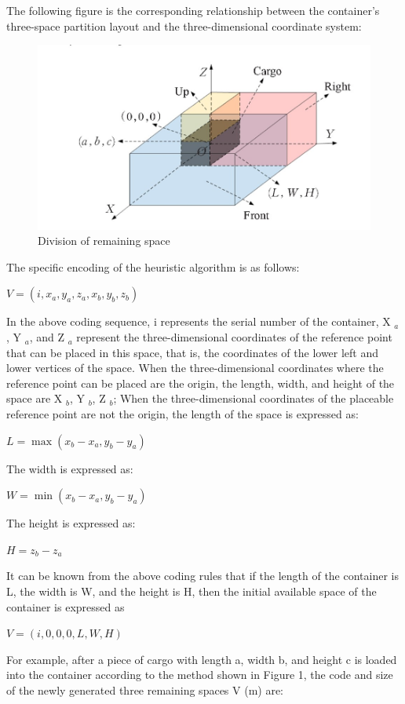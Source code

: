 \documentclass{article} %
\begin{document}
The following figure is the corresponding relationship between the container's three-space partition layout and the three-dimensional coordinate system:
\begin{figure}[h]
    \centering
    \includegraphics[scale=0.6]{99.png}
    \caption{Division of remaining space}
\end{figure}
The specific encoding of the heuristic algorithm is as follows:

\centerline{$V=\left(i, x_{a}, y_{a}, z_{a}, x_{b}, y_{b}, z_{b}\right)$}
In the above coding sequence, i represents the serial number of the container, X $ _a $, Y $ _a $, and Z $ _a $ represent the three-dimensional coordinates of the reference point that can be placed in this space, that is, the coordinates of the lower left and lower vertices of the space.
When the three-dimensional coordinates where the reference point can be placed are the origin, the length, width, and height of the space are X $ _b $, Y $ _b $, Z $ _b $;
When the three-dimensional coordinates of the placeable reference point are not the origin, the length of the space is expressed as:
\centerline{$L=\max \left(x_{b}-x_{a}, y_{b}-y_{a}\right)$}
The width is expressed as:

\centerline{$W=\min \left(x_{b}-x_{a}, y_{b}-y_{a}\right)$}

The height is expressed as:

\centerline{$H=z_{b}-z_{a}$}

It can be known from the above coding rules that if the length of the container is L, the width is W, and the height is H, then the initial available space of the container is expressed as

\centerline{$V=(i, 0,0,0, L, W, H)$}
For example, after a piece of cargo with length a, width b, and height c is loaded into the container according to the method shown in Figure 1, the code and size of the newly generated three remaining spaces V (m) are:
\end{document}
